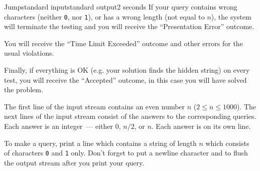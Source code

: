\begin{problem}{Jump}{standard input}{standard output}{2 seconds}
If your query contains wrong characters (neither \texttt{0}, nor \texttt{1}), 
or has a wrong length (not equal to $n$), the system will terminate the testing and you will receive 
the ``Presentation Error'' outcome. 

You will receive the ``Time Limit Exceeded'' outcome and other errors for the usual violations.

Finally, if everything is OK (e.g. your solution finds the hidden string) on every test,
you will receive the ``Accepted'' outcome, in this case you will have solved the problem.

\InputFile

The first line of the input stream contains an even number $n$ ($2 \le n \le 1000$).
The next lines of the input stream consist of the answers to the corresponding queries.
Each answer is an integer~--- either $0$, $n/2$, or $n$. Each answer is on its own line.

\OutputFile

To make a query, print a line which contains a string of length $n$ which consists of characters 
\texttt{0} and \texttt{1} only. Don't forget to put a newline character and to flush 
the output stream after you print your query.

\Example

\begin{example}%
%
\end{example}

\end{problem}

